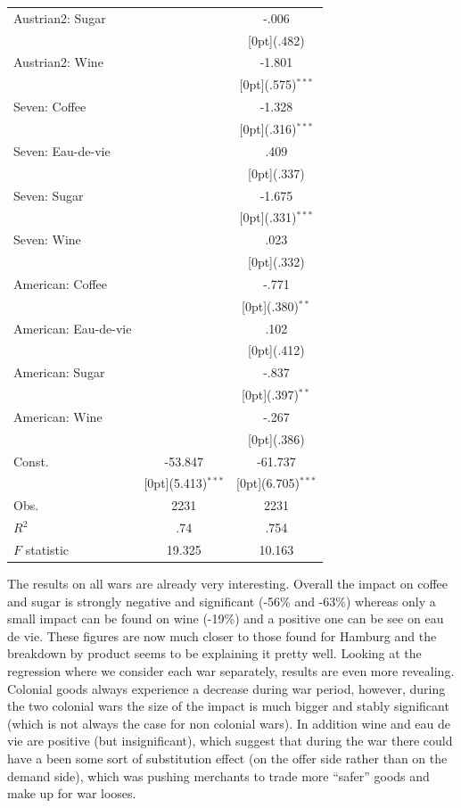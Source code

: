 \documentclass[12pt,a4paper,titlepage]{article}
\begin{document}
{\begin{tabular*}{\textwidth}{@{\extracolsep{\fill}}lcc}
Austrian2: Sugar &	&	-.006 \\
&	&	\raisebox{.7ex}[0pt]{\scriptsize (.482)} \\
Austrian2: Wine &	&	-1.801 \\
&	&	\raisebox{.7ex}[0pt]{\scriptsize (.575)$^{***}$} \\
Seven: Coffee &	&	-1.328 \\
&	&	\raisebox{.7ex}[0pt]{\scriptsize (.316)$^{***}$} \\
Seven: Eau-de-vie &	&	.409 \\
&	&	\raisebox{.7ex}[0pt]{\scriptsize (.337)} \\
Seven: Sugar &	&	-1.675 \\
&	&	\raisebox{.7ex}[0pt]{\scriptsize (.331)$^{***}$} \\
Seven: Wine &	&	.023 \\
&	&	\raisebox{.7ex}[0pt]{\scriptsize (.332)} \\
American: Coffee &	&	-.771 \\
&	&	\raisebox{.7ex}[0pt]{\scriptsize (.380)$^{**}$} \\
American: Eau-de-vie &	&	.102 \\
&	&	\raisebox{.7ex}[0pt]{\scriptsize (.412)} \\
American: Sugar &	&	-.837 \\
&	&	\raisebox{.7ex}[0pt]{\scriptsize (.397)$^{**}$} \\
American: Wine &	&	-.267 \\
&	&	\raisebox{.7ex}[0pt]{\scriptsize (.386)} \\
Const. &	-53.847 &	-61.737 \\
&	\raisebox{.7ex}[0pt]{\scriptsize (5.413)$^{***}$} &	\raisebox{.7ex}[0pt]{\scriptsize (6.705)$^{***}$} \\
Obs. &	2231 &	2231 \\
$ R^2$ &	.74 &	.754 \\
$ F$ statistic &	19.325 &	10.163 \\
\hline\hline		
\end{tabular*}}
The results on all wars are already very interesting. Overall the impact on coffee and sugar is strongly negative and significant (-56\% and -63\%) whereas only a small impact can be found on wine (-19\%) and a positive one can be see on eau de vie. These figures are now much closer to those found for Hamburg and the breakdown by product seems to be explaining it pretty well. Looking at the regression where we consider each war separately, results are even more revealing. Colonial goods always experience a decrease during war period, however, during the two colonial wars the size of the impact is much bigger and stably significant (which is not always the case for non colonial wars). In addition wine and eau de vie are positive (but insignificant), which suggest that during the war there could have a been some sort of substitution effect (on the offer side rather than on the demand side), which was pushing merchants to trade more “safer” goods and make up for war looses.\\
\end{document}
